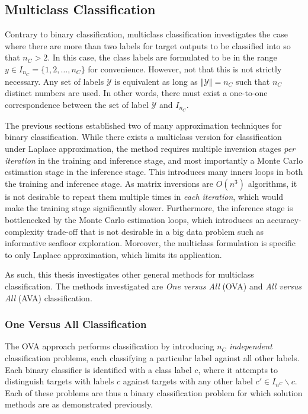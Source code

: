 		\subsection{Multiclass Classification}
		\label{BenthicHabitatMapping:Classification:MulticlassClassification}
		
			Contrary to binary classification, multiclass classification investigates the case where there are more than two labels for target outputs to be classified into so that $n_{C} > 2$. In this case, the class labels are formulated to be in the range $y \in I_{n_{C}} = \{1, 2, \dots, n_{C}\}$ for convenience. However, not that this is not strictly necessary. Any set of labels $\mathcal{Y}$ is equivalent as long as $\Vert \mathcal{Y} \Vert = n_{C}$ such that $n_{C}$ distinct numbers are used. In other words, there must exist a one-to-one correspondence between the set of label $\mathcal{Y}$ and $I_{n_{C}}$.
			
			The previous sections established two of many approximation techniques for binary classification. While there exists a multiclass version for classification under Laplace approximation, the method requires multiple inversion stages \textit{per iteration} in the training and inference stage, and most importantly a Monte Carlo estimation stage in the inference stage. This introduces many inners loops in both the training and inference stage. As matrix inversions are $O(n^{3})$ algorithms, it is not desirable to repeat them multiple times in \textit{each iteration}, which would make the training stage significantly slower. Furthermore, the inference stage is bottlenecked by the Monte Carlo estimation loops, which introduces an accuracy-complexity trade-off that is not desirable in a big data problem such as informative seafloor exploration. Moreover, the multiclass formulation is specific to only Laplace approximation, which limits its application.
			
			As such, this thesis investigates other general methods for multiclass classification. The methods investigated are \textit{One versus All} (OVA) and \textit{All versus All} (AVA) classification.
	
			\subsubsection{One Versus All Classification}
			\label{BenthicHabitatMapping:Classification:MulticlassClassification:OVA}
						
				The OVA approach performs classification by introducing $n_{C}$ \textit{independent} classification problems, each classifying a particular label against all other labels. Each binary classifier is identified with a class label $c$, where it attempts to distinguish targets with labels $c$ against targets with any other label $c' \in I_{n^{C}} \backslash c$. Each of these problems are thus a binary classification problem for which solution methods are as demonstrated previously.
				

